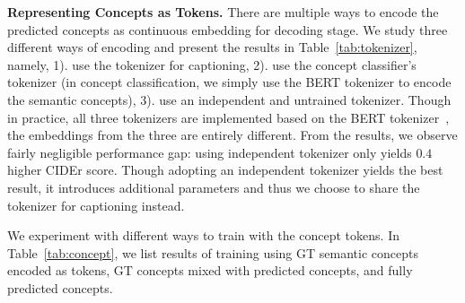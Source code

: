 \noindent\textbf{Representing Concepts as Tokens.} There are multiple ways to encode the predicted concepts as continuous embedding for decoding stage. We study three different ways of encoding and present the results in Table~\ref{tab:tokenizer}, namely, 1). use the tokenizer for captioning, 2). use the concept classifier's tokenizer (in concept classification, we simply use the BERT tokenizer to encode the semantic concepts), 3). use an independent and untrained tokenizer. Though in practice, all three tokenizers are implemented based on the BERT tokenizer~\citep{devlin2018bert}, the embeddings from the three are entirely different. From the results, we observe fairly negligible performance gap: using independent tokenizer only yields $0.4$ higher CIDEr score. Though adopting an independent tokenizer yields the best result, it introduces additional parameters and thus we choose to share the tokenizer for captioning instead. 




\begin{table}[h]
\centering
\setlength{\tabcolsep}{4pt} %
\renewcommand{\arraystretch}{1.15} %
\caption{\small Performances of ViTCAP using either ground-truth concepts for captioning, the concept network predicted concept tokens, or the mixed of them during training. 
}
\label{tab:concept}
\end{table} 

We experiment with different ways to train with the concept tokens. In Table~\ref{tab:concept}, we list results of training using GT semantic concepts encoded as tokens, GT concepts mixed with predicted concepts, and fully predicted concepts.

